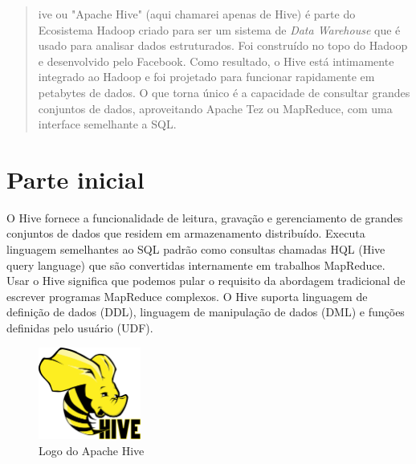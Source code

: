 \documentclass[a4paper,11pt]{article}
\begin{document}
	
	\maketitle %
	\thispagestyle{fancy} %
	
\begin{abstract}
	ive\cite{hiveoficial} ou "Apache Hive" (aqui chamarei apenas de Hive) é parte do Ecosistema Hadoop criado para ser um sistema de \textit{Data Warehouse} que é usado para analisar dados estruturados. Foi construído no topo do Hadoop e desenvolvido pelo Facebook. Como resultado, o Hive está intimamente integrado ao Hadoop e foi projetado para funcionar rapidamente em petabytes de dados. O que torna único é a capacidade de consultar grandes conjuntos de dados, aproveitando Apache Tez ou MapReduce, com uma interface semelhante a SQL. 
\end{abstract}

\section{Parte inicial}
O Hive fornece a funcionalidade de leitura, gravação e gerenciamento de grandes conjuntos de dados que residem em armazenamento distribuído. Executa linguagem semelhantes ao SQL padrão como consultas chamadas HQL (Hive query language) que são convertidas internamente em trabalhos MapReduce. Usar o Hive significa que podemos pular o requisito da abordagem tradicional de escrever programas MapReduce complexos. O Hive suporta linguagem de definição de dados (DDL), linguagem de manipulação de dados (DML) e funções definidas pelo usuário (UDF).  

\begin{figure}[H]
	\centering
	\includegraphics[width=0.3\textwidth]{imagem/logo}
	\caption{Logo do Apache Hive}
\end{figure}
\end{document}
